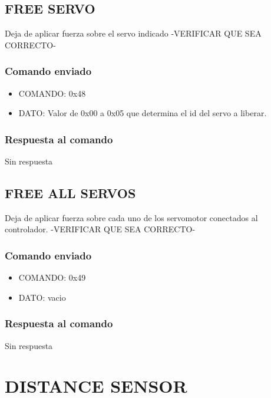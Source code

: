 \documentclass[a4paper,10pt]{article}
\begin{document}
\subsection{FREE SERVO}
\label{free_servo}

Deja de aplicar fuerza sobre el servo indicado -VERIFICAR QUE SEA CORRECTO-

\subsubsection*{Comando enviado}

\begin{itemize}
	\item{COMANDO:} 0x48
	\item{DATO:} Valor de 0x00 a 0x05 que determina el id del servo a liberar.
\end{itemize}

\subsubsection*{Respuesta al comando}

Sin respuesta

\subsection{FREE ALL SERVOS}
\label{free_all_servos}

Deja de aplicar fuerza sobre cada uno de los servomotor conectados al controlador. -VERIFICAR QUE SEA CORRECTO-

\subsubsection*{Comando enviado}

\begin{itemize}
	\item{COMANDO:} 0x49
	\item{DATO:} vacio
\end{itemize}

\subsubsection*{Respuesta al comando}

Sin respuesta

\section{DISTANCE SENSOR} 
\label{grupo_distance_sensor}
\end{document}
